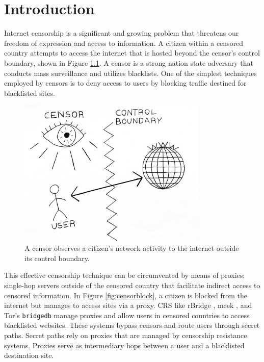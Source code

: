 \chapter{Introduction}
\label{sec:intro} 

Internet censorship is a significant and growing problem that threatens our freedom of expression and access to information. A citizen within a censored country attempts to access the internet that is hosted beyond the censor's control boundary, shown in Figure \ref{fig:simplecensor}. A censor is a strong nation state adversary that conducts mass surveillance and utilizes blacklists. One of the simplest techniques employed by censors is to deny access to users by blocking traffic destined for blacklisted sites. 

\begin{figure}[h!]
\centering
     \includegraphics[width=0.8\textwidth]{fig/censor_simple_new.png}
    \caption{A censor observes a citizen's network activity to the internet outside its control boundary.}
    
    \label{fig:simplecensor}
\end{figure}

This effective censorship technique can be circumvented by means of proxies; single-hop servers outside of the censored country that facilitate indirect access to censored information. In Figure \ref{fig:censorblock}, a citizen is blocked from the internet but manages to access sites via a proxy. \ac{CRS} like rBridge \cite{wang2013rbridge}, meek \cite{Fifield2017a}, and Tor's \texttt{bridgedb} \cite{BridgeDB:2019} manage proxies and allow users in censored countries to access blacklisted websites. These systems bypass censors and route users through secret paths. Secret paths rely on proxies that are managed by censorship resistance systems. Proxies serve as intermediary hops between a user and a blacklisted destination site.

